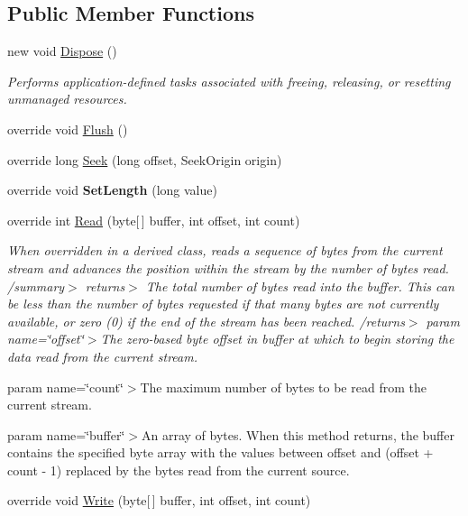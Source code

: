 \subsection*{Public Member Functions}
\begin{DoxyCompactItemize}
\item 
new void \mbox{\hyperlink{class_a_d_l_1_1_pipe_stream_a430dca29f0cd1ff4a27fc7bcafbe7a8f}{Dispose}} ()
\begin{DoxyCompactList}\small\item\em Performs application-\/defined tasks associated with freeing, releasing, or resetting unmanaged resources. \end{DoxyCompactList}\item 
override void \mbox{\hyperlink{class_a_d_l_1_1_pipe_stream_aef56d04b8d784d6606ed348971eb29f3}{Flush}} ()
\item 
override long \mbox{\hyperlink{class_a_d_l_1_1_pipe_stream_ae34adb2842a65053e2e13dcb15fe65e5}{Seek}} (long offset, Seek\+Origin origin)
\item 
\mbox{\label{class_a_d_l_1_1_pipe_stream_a66a10533676de87061ae89c0ab2c62c5}} 
override void {\bfseries Set\+Length} (long value)
\item 
\mbox{\label{class_a_d_l_1_1_pipe_stream_ada829c0b71d6896e2bb3cd5d37ccba34}} 
override int \mbox{\hyperlink{class_a_d_l_1_1_pipe_stream_ada829c0b71d6896e2bb3cd5d37ccba34}{Read}} (byte\mbox{[}$\,$\mbox{]} buffer, int offset, int count)
\begin{DoxyCompactList}\small\item\em When overridden in a derived class, reads a sequence of bytes from the current stream and advances the position within the stream by the number of bytes read. /summary$>$ returns$>$ The total number of bytes read into the buffer. This can be less than the number of bytes requested if that many bytes are not currently available, or zero (0) if the end of the stream has been reached. /returns$>$ param name=\char`\"{}offset\char`\"{}$>$The zero-\/based byte offset in buffer at which to begin storing the data read from the current stream. 

param name=\char`\"{}count\char`\"{}$>$The maximum number of bytes to be read from the current stream. 

param name=\char`\"{}buffer\char`\"{}$>$An array of bytes. When this method returns, the buffer contains the specified byte array with the values between offset and (offset + count -\/ 1) replaced by the bytes read from the current source. \end{DoxyCompactList}\item 
override void \mbox{\hyperlink{class_a_d_l_1_1_pipe_stream_a5f8e6e0a0b7070fc2e5320d2007eadd1}{Write}} (byte\mbox{[}$\,$\mbox{]} buffer, int offset, int count)
\end{DoxyCompactItemize}
